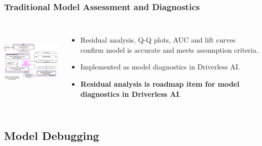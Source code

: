 \documentclass[11pt,
               aspectratio=169,
               hyperref={colorlinks}
               ]{beamer}
\begin{document}
			\begin{frame}
		
				\frametitle{Traditional Model Assessment and Diagnostics}		
			
				\begin{columns}			
			
					\centering
					\includegraphics[height=100pt]{img/ma.png}
				
					\vspace{-5pt}
					\begin{itemize}
						\item Residual analysis, Q-Q plots, AUC and lift curves confirm model is accurate and meets assumption criteria.
						\item Implemented as model diagnostics in Driverless AI.
						\item \textbf{Residual analysis is roadmap item for model diagnostics in Driverless AI}.
					\end{itemize}
				
				\end{columns}
		
			\end{frame}

		\subsection{Model Debugging}
\end{document}
